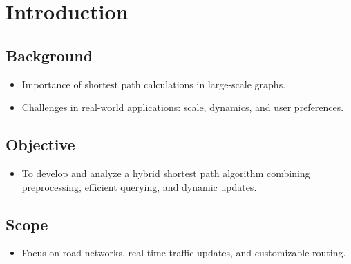\chapter{Introduction}

\section{Background}
	\begin{itemize}
	\item Importance of shortest path calculations in large-scale graphs.
	\item Challenges in real-world applications: scale, dynamics, and user preferences.
	\end{itemize}
\section{Objective}
	\begin{itemize}
	\item To develop and analyze a hybrid shortest path algorithm combining preprocessing, efficient querying, and dynamic updates.
	\end{itemize}
\section{Scope}
	\begin{itemize}
	\item Focus on road networks, real-time traffic updates, and customizable routing.
	\end{itemize}